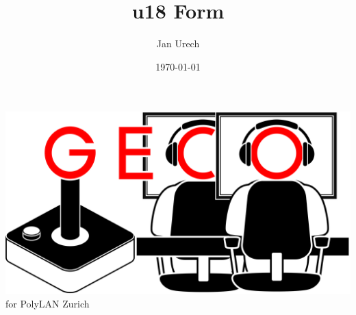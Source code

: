 \documentclass{article}
\title{u18 Form}
\author{Jan Urech}
\date{\today}
\begin{document}
\makeatletter
\includegraphics[scale=0.0255]{GECo.png}  
\hspace{0.5cm}
\LARGE \@title  
\hspace{0.1cm}
for PolyLAN Zurich\\ \normalsize
\vspace{0.5cm}
\raggedright
\end{document}
